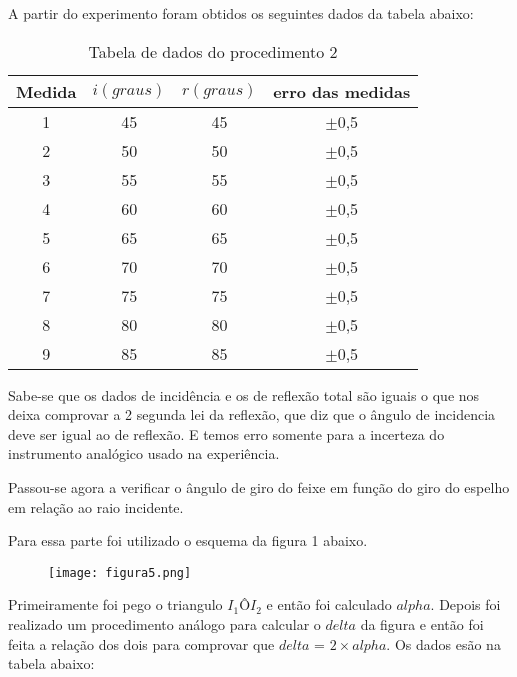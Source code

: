 \documentclass [a4paper, 12pt]{article}
\begin{document}
A partir do experimento foram obtidos os seguintes dados da tabela abaixo:

\newpage
\begin{table}[h]
\centering
\caption{Tabela de dados do procedimento 2}
\vspace{0.5cm}
\begin{tabular}{|c|c|c|c|} \hline
Medida & $i(graus)$ & $r(graus)$ & erro das medidas  \\ \hline 

1   &   45   &   45  &  $\pm$0,5     \\  \hline
2   &   50   &   50  &  $\pm$0,5    \\  \hline
3   &   55   &   55  &  $\pm$0,5    \\  \hline
4   &   60   &   60  &  $\pm$0,5    \\  \hline
5   &   65   &   65  &  $\pm$0,5    \\  \hline
6   &   70   &   70  &  $\pm$0,5    \\  \hline
7   &   75   &   75  &  $\pm$0,5    \\  \hline
8   &   80   &   80  &  $\pm$0,5    \\  \hline
9   &   85   &   85  &  $\pm$0,5    \\  \hline
\end{tabular}
\end{table}

Sabe-se que os dados de incidência e os de reflexão total são iguais o que nos deixa comprovar a 2 segunda lei da reflexão, que diz que o ângulo de incidencia deve ser igual ao de reflexão. E temos erro somente para a incerteza do instrumento analógico usado na experiência.


Passou-se agora a verificar o ângulo de giro do feixe em função do giro do espelho em relação ao raio incidente.

Para essa parte foi utilizado o esquema da figura 1 abaixo.

\begin{figure}[!h]
\centering
{\texttt{[image: figura5.png]}}
\caption{\label{fig:figura5} \empty}
\end{figure}

Primeiramente foi pego o triangulo $I_1$Ô$I_2$ e então foi calculado $alpha$. Depois foi realizado um procedimento análogo para calcular o $delta$ da figura e então foi feita a relação dos dois para comprovar que $delta$ = $2\times alpha$. Os dados esão na tabela abaixo:
\end{document}
